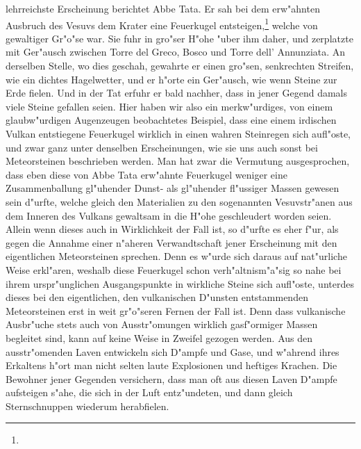 \documentclass[a4paper, 8pt, oneside, polutonikogreek, german]{article}
\begin{document}
lehrreichste Erscheinung berichtet Abbe Tata. Er sah bei dem erw"ahnten Ausbruch des Vesuvs dem Krater eine Feuerkugel entsteigen,\footnote{} welche von gewaltiger Gr"o"se war. Sie fuhr in gro"ser H"ohe "uber ihm daher, und zerplatzte mit Ger"ausch zwischen Torre del Greco, Bosco und Torre dell' Annunziata. An derselben Stelle, wo dies geschah, gewahrte er einen gro"sen, senkrechten Streifen, wie ein dichtes Hagelwetter, und er h"orte ein Ger"ausch, wie wenn Steine zur Erde fielen. Und in der Tat erfuhr er bald nachher, dass in jener Gegend damals viele Steine gefallen seien. Hier haben wir also ein merkw"urdiges, von einem glaubw"urdigen Augenzeugen beobachtetes Beispiel, dass eine einem irdischen Vulkan entstiegene Feuerkugel wirklich in einen wahren Steinregen sich aufl"oste, und zwar ganz unter denselben Erscheinungen, wie sie uns auch sonst bei Meteorsteinen beschrieben werden. Man hat zwar die Vermutung ausgesprochen, dass eben diese von Abbe Tata erw"ahnte Feuerkugel weniger eine Zusammenballung gl"uhender Dunst- als gl"uhender fl"ussiger Massen gewesen sein d"urfte, welche gleich den Materialien zu den sogenannten Vesuvstr"anen aus dem Inneren des Vulkans gewaltsam in die H"ohe geschleudert worden seien. Allein wenn dieses auch in Wirklichkeit der Fall ist, so d"urfte es eher f"ur, als gegen die Annahme einer n"aheren Verwandtschaft jener Erscheinung mit den eigentlichen Meteorsteinen sprechen. Denn es w"urde sich daraus auf nat"urliche Weise erkl"aren, weshalb diese Feuerkugel schon verh"altnism"a"sig so nahe bei ihrem urspr"unglichen Ausgangspunkte in wirkliche Steine sich aufl"oste, unterdes dieses bei den eigentlichen, den vulkanischen D"unsten entstammenden Meteorsteinen erst in weit gr"o"seren Fernen der Fall ist. Denn dass vulkanische Ausbr"uche stets auch von Ausstr"omungen wirklich gasf"ormiger Massen begleitet sind, kann auf keine Weise in Zweifel gezogen werden. Aus den ausstr"omenden Laven entwickeln sich D"ampfe und Gase, und w"ahrend ihres Erkaltens h"ort man nicht selten laute Explosionen und heftiges Krachen. Die Bewohner jener Gegenden versichern, dass man oft aus diesen Laven D"ampfe aufsteigen s"ahe, die sich in der Luft entz"undeten, und dann gleich Sternschnuppen wiederum herabfielen.
\end{document}
